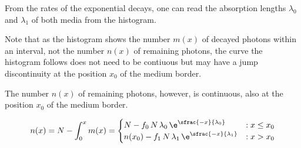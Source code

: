 From the rates of the exponential decays, one can read the absorption lengths $\lambda_0$ and $\lambda_1$ of both media from the histogram.

Note that as the histogram shows the number $m(x)$ of decayed photons within an interval, not the number $n(x)$ of remaining photons, the curve the histogram follows does not need to be contiuous but may have a jump discontinuity at the position $x_0$ of the medium border.

The number $n(x)$ of remaining photons, however, is continuous, also at the position $x_0$ of the medium border.

$$
  n(x) = N - \int_0^x m(x) = \begin{cases}
    N - f_0\,N\,\lambda_0\,\e^{\sfrac{-x}{\lambda_0}} & : x \leq x_0 \\
    n(x_0) - f_1\,N\,\lambda_1\,\e^{\sfrac{-x}{\lambda_1}} & : x > x_0
  \end{cases}
$$

